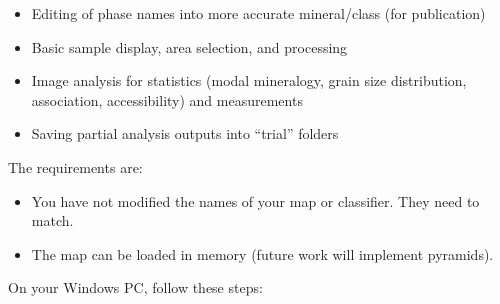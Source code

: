 	\begin{itemize}
		\item
		Editing of phase names into more accurate mineral/class (for publication)
		\item
		Basic sample display, area selection, and processing
		\item
		Image analysis for statistics (modal mineralogy, grain size distribution, association, accessibility) and measurements
		\item
		Saving partial analysis outputs into ``trial'' folders
	\end{itemize}
	
	The requirements are:
	
	\begin{itemize}
		\item
		You have not modified the names of your map or classifier. They need to match.
		\item
		The map can be loaded in memory (future work will implement pyramids).
	\end{itemize}
	
	On your Windows PC, follow these steps:
	
